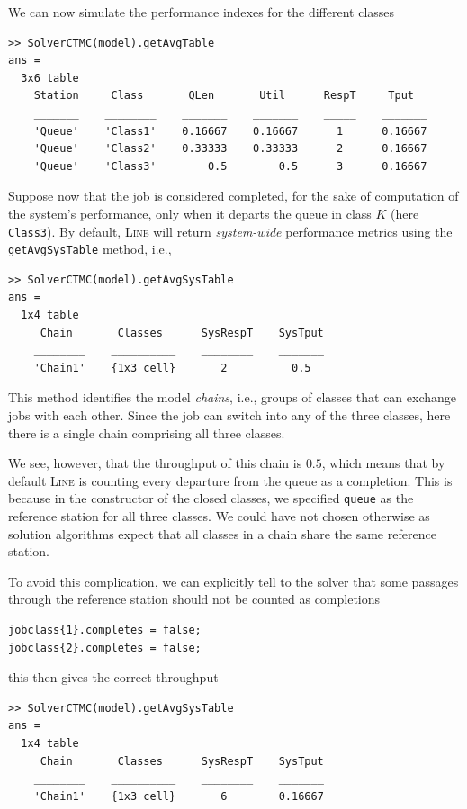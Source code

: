 We can now simulate the performance indexes for the different classes
\begin{lstlisting}
>> SolverCTMC(model).getAvgTable
ans =
  3x6 table
    Station     Class       QLen       Util      RespT     Tput
    _______    ________    _______    _______    _____    _______
    'Queue'    'Class1'    0.16667    0.16667      1      0.16667
    'Queue'    'Class2'    0.33333    0.33333      2      0.16667
    'Queue'    'Class3'        0.5        0.5      3      0.16667
\end{lstlisting}
Suppose now that the job is considered completed, for the sake of computation of the system's performance, only when it departs the queue in class $K$ (here \texttt{Class3}). By default, \textsc{Line} will return \emph{system-wide} performance metrics using the \texttt{getAvgSysTable} method, i.e.,
\begin{lstlisting}
>> SolverCTMC(model).getAvgSysTable
ans =
  1x4 table
     Chain       Classes      SysRespT    SysTput
    ________    __________    ________    _______
    'Chain1'    {1x3 cell}       2          0.5
\end{lstlisting}
This method identifies the model \emph{chains}, i.e., groups of classes that can exchange jobs with each other. Since the job can switch into any of the three classes, here there is a single chain comprising all three classes.

We see, however, that the throughput of this chain is $0.5$, which means that by default \textsc{Line} is counting every departure from the queue as a completion. This is because in the constructor of the closed classes, we specified \texttt{queue} as the reference station for all three classes. We could have not chosen otherwise as solution algorithms expect that all classes in a chain share the same reference station. 

To avoid this complication, we can explicitly tell to the solver that some passages through the reference station should not be counted as completions
\begin{lstlisting}
jobclass{1}.completes = false;
jobclass{2}.completes = false;
\end{lstlisting}
this then gives the correct throughput
\begin{lstlisting}
>> SolverCTMC(model).getAvgSysTable
ans =
  1x4 table
     Chain       Classes      SysRespT    SysTput
    ________    __________    ________    _______
    'Chain1'    {1x3 cell}       6        0.16667
\end{lstlisting}

